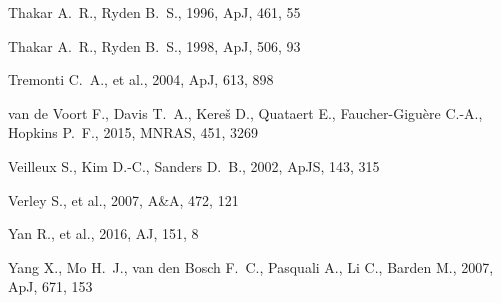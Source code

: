 \documentclass[a4paper,fleqn,usenatbib]{mnras}
\begin{document}
\begin{thebibliography}{}
 Thakar A.~R., Ryden B.~S., 1996, ApJ, 461, 55 


 Thakar A.~R., Ryden B.~S., 1998, ApJ, 506, 93 

 Tremonti C.~A., et al., 2004, ApJ, 613, 898 

 van de Voort F., Davis T.~A., Kere{\v s} D., Quataert E., Faucher-Gigu{\`e}re C.-A., Hopkins P.~F., 2015, MNRAS, 451, 3269 

 Veilleux S., Kim D.-C., Sanders D.~B., 2002, ApJS, 143, 315 

 Verley S., et al., 2007, A\&A, 472, 121

 




 Yan R., et al., 2016, AJ, 151, 8 

 Yang X., Mo H.~J., van den Bosch F.~C., Pasquali A., Li C., Barden M., 2007, ApJ, 671, 153 

\end{thebibliography}


\end{document}
